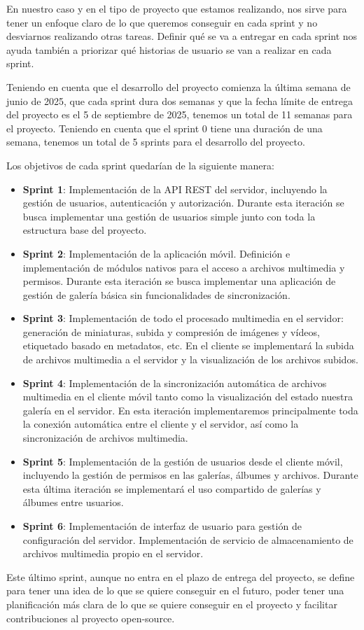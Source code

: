 En nuestro caso y en el tipo de proyecto que estamos realizando, nos sirve para tener un enfoque claro de lo que queremos conseguir en cada sprint y no desviarnos realizando otras tareas.
Definir qué se va a entregar en cada sprint nos ayuda también a priorizar qué historias de usuario se van a realizar en cada sprint.

Teniendo en cuenta que el desarrollo del proyecto comienza la última semana de junio de 2025, que cada sprint dura dos semanas y que la fecha límite de entrega del proyecto es el 5 de septiembre de 2025, tenemos un total de 11 semanas para el proyecto. Teniendo en cuenta que el sprint 0 tiene una duración de una semana, tenemos un total de 5 sprints para el desarrollo del proyecto.

Los objetivos de cada sprint quedarían de la siguiente manera:
\begin{itemize}
    \item \textbf{Sprint 1}: Implementación de la API REST del servidor, incluyendo la gestión de usuarios, autenticación y autorización. Durante esta iteración se busca implementar una gestión de usuarios simple junto con toda la estructura base del proyecto.
    \item \textbf{Sprint 2}: Implementación de la aplicación móvil. Definición e implementación de módulos nativos para el acceso a archivos multimedia y permisos. Durante esta iteración se busca implementar una aplicación de gestión de galería básica sin funcionalidades de sincronización. 
    \item \textbf{Sprint 3}: Implementación de todo el procesado multimedia en el servidor: generación de miniaturas, subida y compresión de imágenes y vídeos, etiquetado basado en metadatos, etc. En el cliente se implementará la subida de archivos multimedia a el servidor y la visualización de los archivos subidos.
    \item \textbf{Sprint 4}: Implementación de la sincronización automática de archivos multimedia en el cliente móvil tanto como la visualización del estado nuestra galería en el servidor. En esta iteración implementaremos principalmente toda la conexión automática entre el cliente y el servidor, así como la sincronización de archivos multimedia.
    \item \textbf{Sprint 5}: Implementación de la gestión de usuarios desde el cliente móvil, incluyendo la gestión de permisos en las galerías, álbumes y archivos. Durante esta última iteración se implementará el uso compartido de galerías y álbumes entre usuarios.
    \item \textbf{Sprint 6}: Implementación de interfaz de usuario para gestión de configuración del servidor. Implementación de servicio de almacenamiento de archivos multimedia propio en el servidor. 
\end{itemize}
Este último sprint, aunque no entra en el plazo de entrega del proyecto, se define para tener una idea de lo que se quiere conseguir en el futuro, poder tener una planificación más clara de lo que se quiere conseguir en el proyecto y facilitar contribuciones al proyecto open-source.


